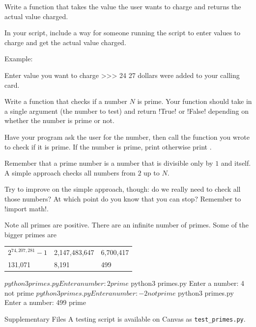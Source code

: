 \documentclass[11pt]{cselabheader}
\begin{document}
{\begin{ex}[calls.py]
    Write a function that takes the value the user wants to charge and returns
    the actual value charged.

    In your script, include a way for someone running the script to enter values
    to charge and get the actual value charged.

    Example:

    \begin{verbatimcode}
Enter value you want to charge >>> 24
27 dollars were added to your calling card.
    \end{verbatimcode}
\end{ex}


\begin{ex}[primes.py]
  Write a function that checks if a number $N$ is prime. Your function should
  take in a single argument (the number to test) and return \pythoninline!True!
  or \pythoninline!False! depending on whether the number is prime or not.

  Have your program ask the user for the number, then call the function you
  wrote to check if it is prime. If the number is prime, print  otherwise print .

Remember that a prime number is a
  number that is divisible only by $1$ and itself.
  A simple approach checks all numbers from $2$ up to $N$.

  Try to improve on the simple approach, though: do we really need to check
  all those numbers? At which point do you know that you can stop? Remember to
  \pythoninline!import math!.

  Note all primes are positive. There are an infinite number of primes. Some of the bigger primes are
  \begin{center}
  \begin{tabular}{lll}
    $2^{74,207,281} - 1$ & 2,147,483,647 & 6,700,417
    \\
    131,071 & 8,191 & 499
  \end{tabular}
  \end{center}


\begin{bashcode}
$ python3 primes.py
Enter a number: 2
prime
$ python3 primes.py
Enter a number: 4
not prime
$ python3 primes.py
Enter a number: -2
not prime
$ python3 primes.py
Enter a number: 499
prime
\end{bashcode}

\end{ex}
\begin{infobox}{Supplementary Files}
A testing script is available on Canvas as \texttt{test\_primes.py}.
\end{infobox}

}
\end{document}
